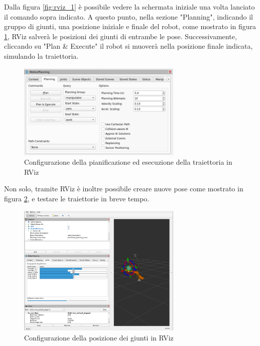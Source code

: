 \documentclass[11pt]{report}
\begin{document}
Dalla figura \ref{fig:rviz_1} è possibile vedere la schermata iniziale una volta lanciato il comando sopra indicato.
A questo punto, nella sezione "Planning", indicando il gruppo di giunti, una posizione iniziale e finale del robot, come mostrato in figura \ref{fig:rviz_2}, RViz salverà le posizioni dei giunti di entrambe le pose. Successivamente, cliccando su "Plan \& Execute" il robot si muoverà nella posizione finale indicata, simulando la traiettoria.

\begin{figure}[H]
    \centering
    \includegraphics[width=0.7\textwidth]{images/rviz_2.PNG}
    \caption{Configurazione della pianificazione ed esecuzione della traiettoria in RViz}
    \label{fig:rviz_2}
\end{figure}

Non solo, tramite RViz è inoltre possibile creare nuove pose come mostrato in figura \ref{fig:rviz_3}, e testare le traiettorie in breve tempo.

\begin{figure}[H]
    \centering
    \includegraphics[width=0.7\textwidth]{images/rviz_3.PNG}
    \caption{Configurazione della posizione dei giunti in RViz}
    \label{fig:rviz_3}
\end{figure}
\end{document}
